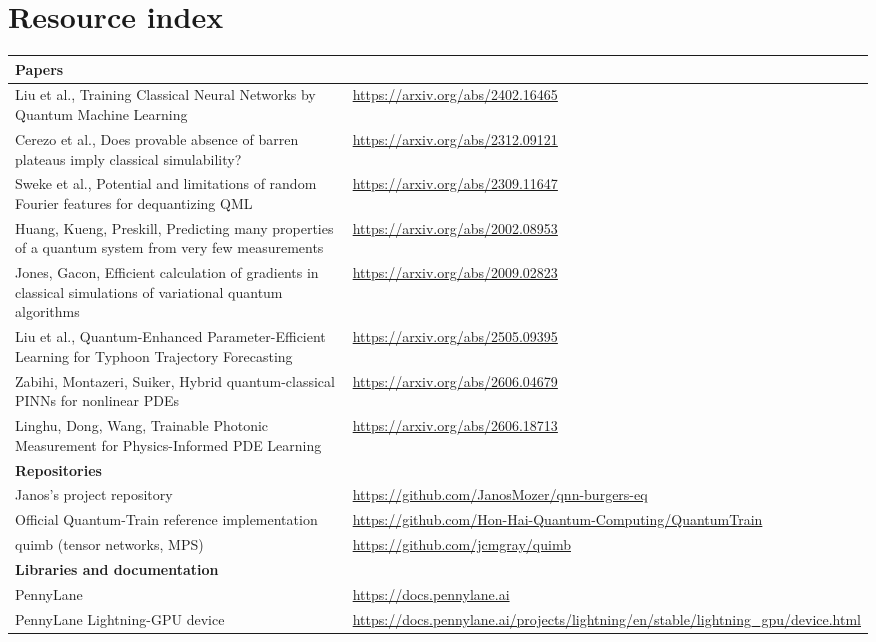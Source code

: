 \documentclass[10pt,a4paper]{article}
\begin{document}
\section{Resource index}

\begin{center}
\small
\begin{tabular}{@{}p{}p{}@{}}
\textbf{Papers} & \\
\hline
Liu et al., Training Classical Neural Networks by Quantum Machine Learning & \url{https://arxiv.org/abs/2402.16465} \\
Cerezo et al., Does provable absence of barren plateaus imply classical simulability? & \url{https://arxiv.org/abs/2312.09121} \\
Sweke et al., Potential and limitations of random Fourier features for dequantizing QML & \url{https://arxiv.org/abs/2309.11647} \\
Huang, Kueng, Preskill, Predicting many properties of a quantum system from very few measurements & \url{https://arxiv.org/abs/2002.08953} \\
Jones, Gacon, Efficient calculation of gradients in classical simulations of variational quantum algorithms & \url{https://arxiv.org/abs/2009.02823} \\
Liu et al., Quantum-Enhanced Parameter-Efficient Learning for Typhoon Trajectory Forecasting & \url{https://arxiv.org/abs/2505.09395} \\
Zabihi, Montazeri, Suiker, Hybrid quantum-classical PINNs for nonlinear PDEs & \url{https://arxiv.org/abs/2606.04679} \\
Linghu, Dong, Wang, Trainable Photonic Measurement for Physics-Informed PDE Learning & \url{https://arxiv.org/abs/2606.18713} \\[4pt]
\textbf{Repositories} & \\
\hline
Janos's project repository & \url{https://github.com/JanosMozer/qnn-burgers-eq} \\
Official Quantum-Train reference implementation & \url{https://github.com/Hon-Hai-Quantum-Computing/QuantumTrain} \\
quimb (tensor networks, MPS) & \url{https://github.com/jcmgray/quimb} \\[4pt]
\textbf{Libraries and documentation} & \\
\hline
PennyLane & \url{https://docs.pennylane.ai} \\
PennyLane Lightning-GPU device & \url{https://docs.pennylane.ai/projects/lightning/en/stable/lightning_gpu/device.html} \\

\end{tabular}
\end{center}
\end{document}
